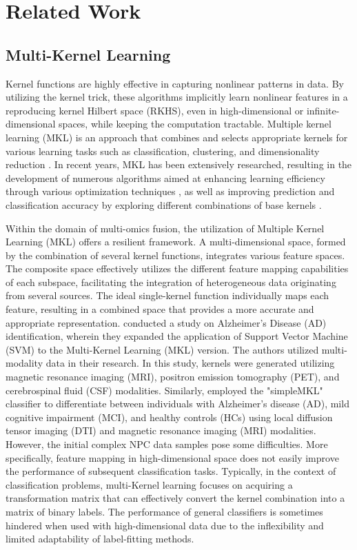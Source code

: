 \section{Related Work}
\subsection{Multi-Kernel Learning}
Kernel functions are highly effective in capturing nonlinear patterns in data. By utilizing the kernel trick, these algorithms implicitly learn nonlinear features in a reproducing kernel Hilbert space (RKHS), even in high-dimensional or infinite-dimensional spaces, while keeping the computation tractable. Multiple kernel learning (MKL) is an approach that combines and selects appropriate kernels for various learning tasks such as classification, clustering, and dimensionality reduction \cite{gonen2011multiple, bucak2013multiple, niazmardi2017multiple}. In recent years, MKL has been extensively researched, resulting in the development of numerous algorithms aimed at enhancing learning efficiency through various optimization techniques \cite{aiolli2015easymkl, alioscha2019svrg}, as well as improving prediction and classification accuracy by exploring different combinations of base kernels \cite{xu2010smooth, varma2009more, cortes2009learning, zhou2016veto}.


Within the domain of multi-omics fusion, the utilization of Multiple Kernel Learning (MKL) offers a resilient framework. A multi-dimensional space, formed by the combination of several kernel functions, integrates various feature spaces. The composite space effectively utilizes the different feature mapping capabilities of each subspace, facilitating the integration of heterogeneous data originating from several sources. The ideal single-kernel function individually maps each feature, resulting in a combined space that provides a more accurate and appropriate representation. \cite{han2013localized} conducted a study on Alzheimer's Disease (AD) identification, wherein they expanded the application of Support Vector Machine (SVM) to the Multi-Kernel Learning (MKL) version. The authors utilized multi-modality data in their research. In this study, kernels were generated utilizing magnetic resonance imaging (MRI), positron emission tomography (PET), and cerebrospinal fluid (CSF) modalities. Similarly, \cite{rakotomamonjy2008simplemkl} employed the "simpleMKL" classifier  to differentiate between individuals with Alzheimer's disease (AD), mild cognitive impairment (MCI), and healthy controls (HCs) using local diffusion tensor imaging (DTI) and magnetic resonance imaging (MRI) modalities. 
However, the initial complex NPC data samples pose some difficulties. More specifically, feature mapping in high-dimensional space does not easily improve the performance of subsequent classification tasks. Typically, in the context of classification problems, multi-Kernel learning focuses on acquiring a transformation matrix that can effectively convert the kernel combination into a matrix of binary labels. The performance of general classifiers is sometimes hindered when used with high-dimensional data due to the inflexibility and limited adaptability of label-fitting methods.


